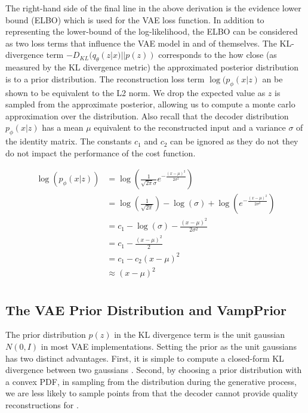 \documentclass[./dissertation.tex]{subfiles}
\begin{document}
    The right-hand side of the final line in the above derivation is the evidence lower bound (ELBO) which is used for the VAE loss function. In addition to representing the lower-bound of the log-likelihood, the ELBO can be considered as two loss terms that influence the VAE model in and of themselves. The KL-divergence term $-D_{KL}(q_{\theta}(z|x)||p(z))$ corresponds to the how close (as measured by the KL divergence metric) the approximated posterior distribution is to a prior distribution. The reconstruction loss term $\log(p_{\phi}(x|z)$ an be shown to be equivalent to the L2 norm. We drop the expected value as $z$ is sampled from the approximate posterior, allowing us to compute a monte carlo approximation over the distribution. Also recall that the decoder distribution $p_{\phi}(x|z) $ has a mean $\mu$ equivalent to the reconstructed input and a variance $\sigma$ of the identity matrix. The constants $c_{1}$ and $c_{2}$ can be ignored as they do not they do not impact the performance of the cost function. 
    
    \begin{equation*}
    \begin{aligned}
    \log(p_{\phi}(x|z)) &= \log(\frac{1}{\sqrt{2\pi}\sigma}e^{{-\frac{(x - \mu)^{2}}{2\sigma^{2}}}}) \\
    &= \log(\frac{1}{\sqrt{2\pi}}) - \log(\sigma) + \log(e^{{-\frac{(x - \mu)^{2}}{2\sigma^{2}}}}) \\
    &= c_{1} - \log(\sigma) - \frac{(x - \mu)^{2}}{2\sigma^{2}} \\
    &= c_{1} - \frac{(x - \mu)^{2}}{2} \\
    &= c_{1} - c_{2}(x - \mu)^{2} \\
    &\approx (x - \mu)^{2} \\
    \end{aligned}
    \end{equation*}
    
    \subsection{The VAE Prior Distribution and VampPrior}
    The prior distribution $p(z)$ in the KL divergence term is the unit gaussian $N(0, I)$ in most VAE implementations. Setting the prior as the unit gaussians has two distinct advantages. First, it is simple to compute a closed-form KL divergence between two gaussians \cite{}. Second, by choosing a prior distribution with a convex PDF, in sampling from the distribution during the generative process, we are less likely to sample points from that the decoder cannot provide quality reconstructions for \cite{}. \\
    
\end{document}
